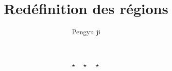 \documentclass{report-UTC}
\title{Redéfinition des régions}
\author{Pengyu {\sc ji}} %
\begin{document}
\setlength{\marginparwidth}{2cm}
\usepackage[french]{babel}






\thispagestyle{empty}

\newpage


\newpage
\tableofcontents{}
\setcounter{page}{0}

% 

\newpage


\newpage


\clearpage


\newpage


\newpage
\printbibliography %

\[ \star \quad \star \quad \star \]
\end{document}
